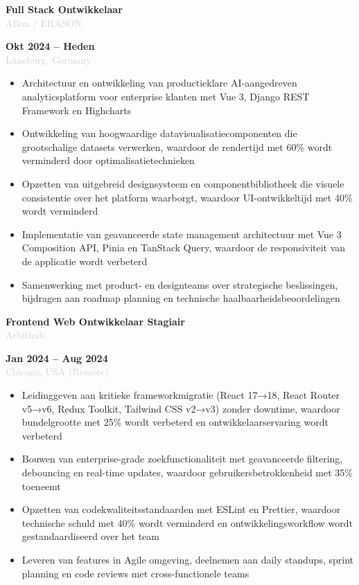 \documentclass[10pt,a4paper]{article}
\newcommand{\Experience}[4]{%
  \vspace{2pt}
  \noindent
  \begin{minipage}[t]{0.70\textwidth}
    {\normalsize\textbf{\color{darkgray}#3}} \\
    \textcolor{lightgray}{\small #1}
  \end{minipage}%
  \hfill
  \begin{minipage}[t]{0.28\textwidth}
    \raggedleft
    \textcolor{mediumgray}{\small\textbf{#4}} \\
    \textcolor{lightgray}{\small #2}
  \end{minipage}
  \vspace{1pt}
}
\begin{document}
\Experience{AIlon / ERASON}{Lüneburg, Germany}{Full Stack Ontwikkelaar}{Okt 2024 -- Heden}
\begin{itemize}
  \item Architectuur en ontwikkeling van productieklare AI-aangedreven analyticsplatform voor enterprise klanten met Vue 3, Django REST Framework en Highcharts
  \item Ontwikkeling van hoogwaardige datavisualisatiecomponenten die grootschalige datasets verwerken, waardoor de rendertijd met 60\% wordt verminderd door optimalisatietechnieken
  \item Opzetten van uitgebreid designsysteem en componentbibliotheek die visuele consistentie over het platform waarborgt, waardoor UI-ontwikkeltijd met 40\% wordt verminderd
  \item Implementatie van geavanceerde state management architectuur met Vue 3 Composition API, Pinia en TanStack Query, waardoor de responsiviteit van de applicatie wordt verbeterd
  \item Samenwerking met product- en designteams over strategische beslissingen, bijdragen aan roadmap planning en technische haalbaarheidsbeoordelingen
\end{itemize}

\Experience{Arbithub}{Chicago, USA (Remote)}{Frontend Web Ontwikkelaar Stagiair}{Jan 2024 -- Aug 2024}
\begin{itemize}
  \item Leidinggeven aan kritieke frameworkmigratie (React 17→18, React Router v5→v6, Redux Toolkit, Tailwind CSS v2→v3) zonder downtime, waardoor bundelgrootte met 25\% wordt verbeterd en ontwikkelaarservaring wordt verbeterd
  \item Bouwen van enterprise-grade zoekfunctionaliteit met geavanceerde filtering, debouncing en real-time updates, waardoor gebruikersbetrokkenheid met 35\% toeneemt
  \item Opzetten van codekwaliteitsstandaarden met ESLint en Prettier, waardoor technische schuld met 40\% wordt verminderd en ontwikkelingsworkflow wordt gestandaardiseerd over het team
  \item Leveren van features in Agile omgeving, deelnemen aan daily standups, sprint planning en code reviews met cross-functionele teams
\end{itemize}
\end{document}
